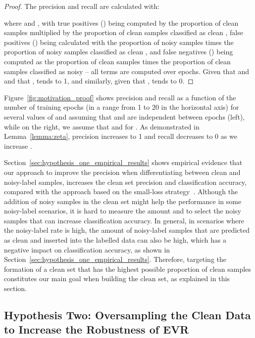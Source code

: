 \documentclass[review]{elsarticle}
\begin{document}
\begin{proof}

The precision and recall are calculated with:

where  and , with true positives () being computed by the proportion of clean samples  multiplied by the proportion of clean samples classified as clean , false positives () being calculated with the proportion of noisy samples  times the proportion of noisy samples classified as clean , and false negatives () being computed as the proportion of clean samples  times the proportion of clean samples classified as noisy  -- all terms are computed over  epochs.
Given that  and  and that
\noindent,   tends to 1, and similarly, given that ,   tends to 0.

\end{proof}

Figure~\ref{fig:motivation_proof} shows precision and recall 
as a function of the number of training epochs  (in a range from 1 to 20 in the horizontal axis)
for several values of  and assuming that  and  are independent between epochs (left), while on the right, we assume that  and  for . 
As demonstrated in Lemma~\ref{lemma:zeta}, precision increases to 1 and recall decreases to 0 as we increase .

 Section~\ref{sec:hypothesis_one_empirical_results} shows empirical evidence that our approach to improve the precision when differentiating between clean and noisy-label samples, increases the clean set precision and classification accuracy, compared with the approach based on the small-loss strategy~\cite{li2020dividemix}. Although the addition of noisy samples in the clean set might help the performance in some noisy-label scenarios, it is hard to measure the amount and to select the noisy samples that can increase classification accuracy. In general, in scenarios where the noisy-label rate is high, the amount of noisy-label samples that are predicted as clean and inserted into the labelled data can also be high, which has a negative impact on classification accuracy, as shown in Section~\ref{sec:hypothesis_one_empirical_results}. 
 Therefore, targeting the formation of a clean set that has the highest possible proportion of clean samples constitutes our main goal when building the clean set, as explained in this section.






\subsection{Hypothesis Two: Oversampling the Clean Data to Increase the Robustness of EVR}
\label{sec:hypothesis_two}
\end{document}
